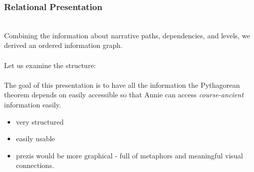 
\begin{frame}
  \frametitle{Relational Presentation}
  \begin{module}[id=relationalPresentation]\\
\noindent
Combining the information about narrative paths, dependencies, and levels, we derived an ordered information graph.\\
\\
\noindent
Let us examine the structure:\\
\\
\noindent
The goal of this presentation is to have all the information the Pythagorean theorem depends on easily accessible so that Annie can access \textit{course-ancient} information easily.
\begin{itemize}
\item very structured
\vspace{-4mm}
\item easily usable
\vspace{-4mm}
\item prezis would be more graphical - full of metaphors and meaningful visual connections.
\end{itemize}


  \end{module}
\end{frame}
